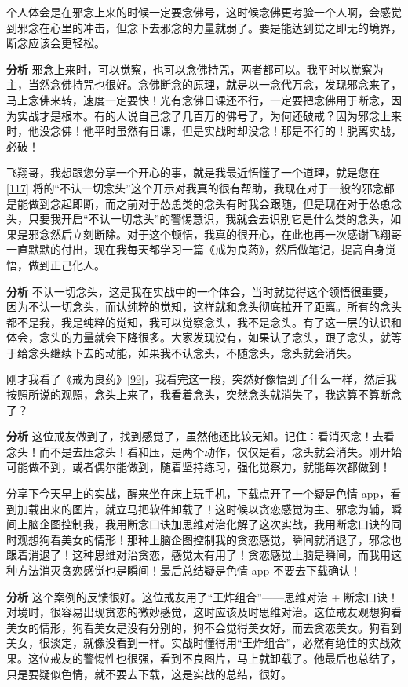 \begin{case}
    个人体会是在邪念上来的时候一定要念佛号，这时候念佛更考验一个人啊，会感觉到邪念在心里的冲击，但念下去邪念的力量就弱了。要是能达到觉之即无的境界，断念应该会更轻松。

    \textbf{分析} 邪念上来时，可以觉察，也可以念佛持咒，两者都可以。我平时以觉察为主，当然念佛持咒也很好。念佛断念的原理，就是以一念代万念，发现邪念来了，马上念佛来转，速度一定要快！光有念佛日课还不行，一定要把念佛用于断念，因为实战才是根本。有的人说自己念了几百万的佛号了，为何还破戒？因为邪念上来时，他没念佛！他平时虽然有日课，但是实战时却没念！那是不行的！脱离实战，必破！
\end{case}

\begin{case}
    飞翔哥，我想跟您分享一个开心的事，就是我最近悟懂了一个道理，就是您在 \ref{117} 将的“不认一切念头”这个开示对我真的很有帮助，我现在对于一般的邪念都是能做到念起即断，而之前对于怂恿类的念头有时我会跟随，但是现在对于怂恿念头，只要我开启“不认一切念头”的警惕意识，我就会去识别它是什么类的念头，如果是邪念然后立刻断除。对于这个顿悟，我真的很开心，在此也再一次感谢飞翔哥一直默默的付出，现在我每天都学习一篇《戒为良药》，然后做笔记，提高自身觉悟，做到正己化人。

    \textbf{分析} 不认一切念头，这是我在实战中的一个体会，当时就觉得这个领悟很重要，因为不认一切念头，而认纯粹的觉知，这样就和念头彻底拉开了距离。所有的念头都不是我，我是纯粹的觉知，我可以觉察念头，我不是念头。有了这一层的认识和体会，念头的力量就会下降很多。大家发现没有，如果认了念头，跟了念头，就等于给念头继续下去的动能，如果我不认念头，不随念头，念头就会消失。
\end{case}

\begin{case}
    刚才我看了《戒为良药》\ref{99}，我看完这一段，突然好像悟到了什么一样，然后我按照所说的观照，念头上来了，我看着念头，突然念头就消失了，我这算不算断念了？

    \textbf{分析} 这位戒友做到了，找到感觉了，虽然他还比较无知。记住：看消灭念！去看念头！而不是去压念头！看和压，是两个动作，仅仅是看，念头就会消失。刚开始可能做不到，或者偶尔能做到，随着坚持练习，强化觉察力，就能每次都做到！
\end{case}

\begin{case}
    分享下今天早上的实战，醒来坐在床上玩手机，下载点开了一个疑是色情 app，看到加载出来的图片，就立马把软件卸载了！这时候以贪恋感觉为主、邪念为辅，瞬间上脑企图控制我，我用断念口诀加思维对治化解了这次实战，我用断念口诀的同时观想狗看美女的情形！那种上脑企图控制我的贪恋感觉，瞬间就消退了，邪念也跟着消退了！这种思维对治贪恋，感觉太有用了！贪恋感觉上脑是瞬间，而我用这种方法消灭贪恋感觉也是瞬间！最后总结疑是色情 app 不要去下载确认！

    \textbf{分析} 这个案例的反馈很好。这位戒友用了“王炸组合”——思维对治 + 断念口诀！对境时，很容易出现贪恋的微妙感觉，这时应该及时思维对治。这位戒友观想狗看美女的情形，狗看美女是没有分别的，狗不会觉得美女好，而去贪恋美女。狗看到美女，很淡定，就像没看到一样。实战时懂得用“王炸组合”，必然有绝佳的实战效果。这位戒友的警惕性也很强，看到不良图片，马上就卸载了。他最后也总结了，只是要疑似色情，就不要去下载，这是实战的总结，很好。
\end{case}

